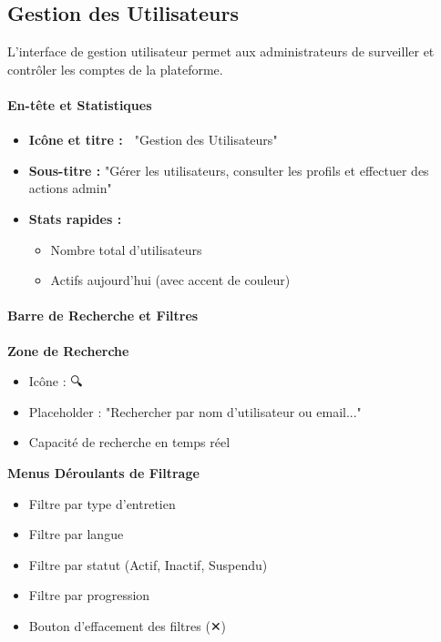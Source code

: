 \documentclass[12pt, a4paper]{report}
\begin{document}
\subsection{Gestion des Utilisateurs}

L'interface de gestion utilisateur permet aux administrateurs de surveiller et contrôler les comptes de la plateforme.

\paragraph{En-tête et Statistiques}
\begin{itemize}
    \item \textbf{Icône et titre :} 👥 "Gestion des Utilisateurs"
    \item \textbf{Sous-titre :} "Gérer les utilisateurs, consulter les profils et effectuer des actions admin"
    \item \textbf{Stats rapides :}
    \begin{itemize}
        \item Nombre total d'utilisateurs
        \item Actifs aujourd'hui (avec accent de couleur)
    \end{itemize}
\end{itemize}

\paragraph{Barre de Recherche et Filtres}

\textbf{Zone de Recherche}
\begin{itemize}
    \item Icône : 🔍
    \item Placeholder : "Rechercher par nom d'utilisateur ou email..."
    \item Capacité de recherche en temps réel
\end{itemize}

\textbf{Menus Déroulants de Filtrage}
\begin{itemize}
    \item Filtre par type d'entretien
    \item Filtre par langue
    \item Filtre par statut (Actif, Inactif, Suspendu)
    \item Filtre par progression
    \item Bouton d'effacement des filtres (✕)
\end{itemize}
\end{document}
